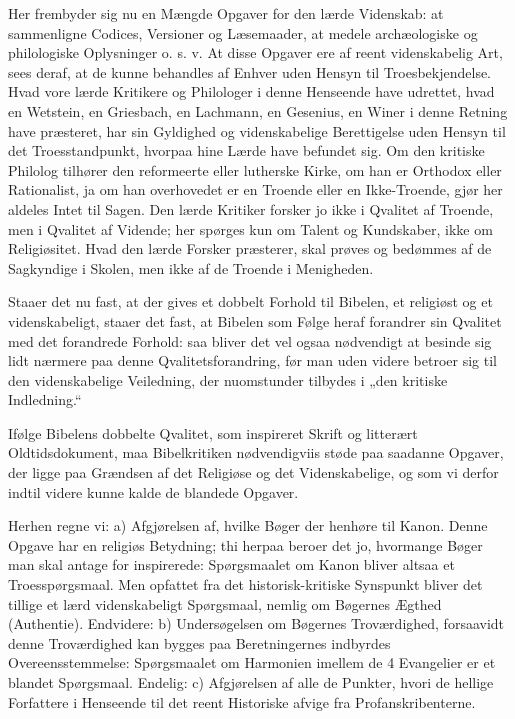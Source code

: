 \documentclass[12pt,a4paper]{book}
\newcommand{\opage}[1]{\marginnote{\footnotesize\textit{[#1]}}}
\begin{document}
Her frembyder sig nu en Mængde Opgaver for den lærde Videnskab: at sammenligne
Codices, Versioner og Læsemaader, at medele archæologiske og philologiske
Oplysninger o. s. v. At disse
\opage{43} Opgaver ere af reent videnskabelig Art, sees deraf, at de kunne behandles af
Enhver uden Hensyn til Troesbekjendelse. Hvad vore lærde Kritikere og Philologer
i denne Henseende have udrettet, hvad en Wetstein, en Griesbach, en Lachmann,
en Gesenius, en Winer i denne Retning have præsteret, har sin Gyldighed og
videnskabelige Berettigelse uden Hensyn til det Troesstandpunkt, hvorpaa hine
Lærde have befundet sig. Om den kritiske Philolog tilhører den reformeerte
eller lutherske Kirke, om han er Orthodox eller Rationalist, ja om han
overhovedet er en Troende eller en Ikke-Troende, gjør her aldeles Intet til
Sagen. Den lærde Kritiker forsker jo ikke i Qvalitet af Troende, men i Qvalitet
af Vidende; her spørges kun om Talent og Kundskaber, ikke om Religiøsitet. Hvad
den lærde Forsker præsterer, skal prøves og bedømmes af de Sagkyndige i Skolen,
men ikke af de Troende i Menigheden.

Staaer det nu fast, at der gives et dobbelt Forhold til Bibelen, et religiøst og
et videnskabeligt, staaer det fast, at Bibelen som Følge heraf forandrer sin
Qvalitet med det forandrede Forhold: saa bliver det vel ogsaa nødvendigt at
besinde sig lidt nærmere paa denne Qvalitetsforandring, før man uden videre
betroer sig til den videnskabelige Veiledning, der nuomstunder tilbydes i „den
kritiske Indledning.“

Ifølge Bibelens dobbelte Qvalitet, som inspireret Skrift og litterært
Oldtidsdokument, maa Bibelkritiken nødvendigviis støde paa saadanne Opgaver,
der ligge paa Grændsen af det Religiøse og det Videnskabelige, og som vi derfor
indtil videre kunne kalde de blandede Opgaver.

Herhen regne vi: a) Afgjørelsen af, hvilke Bøger der henhøre til Kanon. Denne
Opgave har en religiøs Betydning; thi herpaa beroer det jo, hvormange Bøger man
skal antage for inspirerede: Spørgsmaalet om Kanon bliver altsaa et
Troesspørgsmaal. Men opfattet fra det historisk-kritiske Synspunkt
\opage{44} bliver det tillige et lærd videnskabeligt Spørgsmaal, nemlig om Bøgernes Ægthed
(Authentie). Endvidere: b) Undersøgelsen om Bøgernes Troværdighed, forsaavidt
denne Troværdighed kan bygges paa Beretningernes indbyrdes Overeensstemmelse:
Spørgsmaalet om Harmonien imellem de 4 Evangelier er et blandet Spørgsmaal.
Endelig: c) Afgjørelsen af alle de Punkter, hvori de hellige Forfattere i
Henseende til det reent Historiske afvige fra Profanskribenterne.
\end{document}
